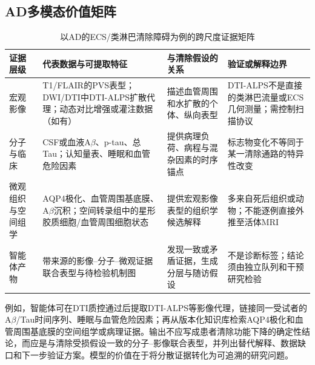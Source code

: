 ﻿\documentclass[11pt,a4paper]{article}
\begin{document}
\subsection{AD多模态价值矩阵}
\begin{table}[htbp]\centering\small
\caption{以AD的ECS/类淋巴清除障碍为例的跨尺度证据矩阵\label{tab:ad}}
\begin{tabularx}{\linewidth}{p{2.5cm}Y Y Y}\toprule
证据层级 & 代表数据与可提取特征 & 与清除假设的关系 & 验证或解释边界\\\midrule
宏观影像 & T1/FLAIR的PVS表型；DWI/DTI中DTI-ALPS扩散代理；动态对比增强或灌注数据（如有） & 描述血管周围和水扩散的个体、纵向表型 & DTI-ALPS不是直接的类淋巴流量或ECS几何测量；需控制扫描协议\cite{taoka2021}\\
分子与临床 & CSF或血液A$\beta$、p-tau、总Tau；认知量表、睡眠和血管危险因素 & 提供病理负荷、病程与混杂因素的时序锚点 & 标志物变化不等同于某一清除通路的特异性改变\\
微观组织与空间组学 & AQP4极化、血管周围基底膜、A$\beta$沉积；空间转录组中的星形胶质细胞/血管周围细胞状态 & 提供宏观影像表型的组织学候选解释 & 多来自死后组织或动物；不能逐例直接外推至活体MRI\\
智能体产物 & 带来源的影像--分子--微观证据联合表型与待检验机制图 & 发现一致或矛盾证据，生成分层与随访假设 & 不是诊断标签；结论须由独立队列和干预研究检验\\\bottomrule
\end{tabularx}
\end{table}

例如，智能体可在DTI质控通过后提取DTI-ALPS等影像代理，链接同一受试者的A$\beta$/Tau时间序列、睡眠与血管危险因素；再从版本化知识库检索AQP4极化和血管周围基底膜的空间组学或病理证据。输出不应写成患者清除功能下降的确定性结论，而应是与清除受损假设一致的分子--影像联合表型，并列出替代解释、数据缺口和下一步验证方案。模型的价值在于将分散证据转化为可追溯的研究问题。
\end{document}
